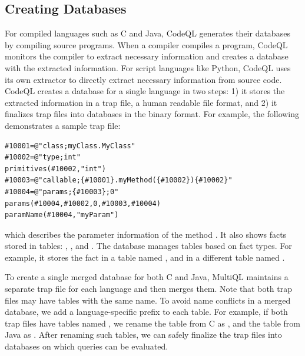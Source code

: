 \subsection{Creating Databases}
For compiled languages such as C and Java, CodeQL generates their databases by
compiling source programs.  When a compiler compiles a program, CodeQL monitors
the compiler to extract necessary information and creates a database with the
extracted information. For script languages like Python, CodeQL uses its own
extractor to directly extract necessary information from source code.
CodeQL creates a database for a single language in two steps:
1) it stores the extracted information in a trap
file, a human readable file format, and 2) it finalizes trap files
into databases in the binary format. For example, the
following demonstrates a sample trap file:

\begin{lstlisting}[style=java,numbers=none]
#10001=@"class;myClass.MyClass"
#10002=@"type;int"
primitives(#10002,"int")
#10003=@"callable;{#10001}.myMethod({#10002}){#10002}"
#10004=@"params;{#10003};0"
params(#10004,#10002,0,#10003,#10004)
paramName(#10004,"myParam")
\end{lstlisting}

\noindent
which describes the parameter information of the method .
It also shows facts stored in tables:
, , and
.
The database manages tables based on fact types. For example, it stores
the fact  in a table named , and
 in a different table named .


To create a single merged database for both C and Java, MultiQL maintains a
separate trap file for each language and then merges them.  
Note that both trap files may have tables with the same name.  
To avoid name conflicts in a merged database, we add a language-specific prefix
to each table.  
For example, if both trap files have tables named , we rename
the table from C as , and the table from Java as
.
After renaming such tables, we can safely finalize the trap files into
databases on which queries can be evaluated.

